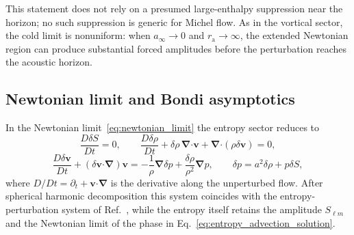 \documentclass[12pt,a4paper,preprint,nopreprintline]{elsarticle}
\begin{document}
This statement does not rely on a presumed large-enthalpy suppression near the horizon; no such suppression is generic for Michel flow. As in the vortical sector, the cold limit is nonuniform: when $a_{\infty}\rightarrow0$ and $r_{\mathrm{a}}\rightarrow\infty$, the extended Newtonian region can produce substantial forced amplitudes before the perturbation reaches the acoustic horizon.

\subsection{Newtonian limit and Bondi asymptotics}
\label{sec:newtonian_bondi_entropy}

In the Newtonian limit~\eqref{eq:newtonian_limit} the entropy sector reduces to
\begin{equation}
    \frac{D\delta S}{Dt}=0,
    \qquad
    \frac{D\delta\rho}{Dt}
    +\delta\rho\,\boldsymbol{\nabla}\boldsymbol{\cdot}\boldsymbol{v}
    +\boldsymbol{\nabla}\boldsymbol{\cdot}
        (\rho\delta\boldsymbol{v})=0,
    \label{eq:entropy_newtonian_continuity}
\end{equation}
\begin{equation}
    \frac{D\delta\boldsymbol{v}}{Dt}
    +
    (\delta\boldsymbol{v}\boldsymbol{\cdot}\boldsymbol{\nabla})
        \boldsymbol{v}
    =
    -\frac{1}{\rho}\boldsymbol{\nabla}\delta p
    +\frac{\delta\rho}{\rho^{2}}\boldsymbol{\nabla}p,
    \qquad
    \delta p=a^{2}\delta\rho+p\delta S,
    \label{eq:entropy_newtonian_euler}
\end{equation}
where $D/Dt=\partial_{t}+\boldsymbol{v}\boldsymbol{\cdot}\boldsymbol{\nabla}$ is the derivative along the unperturbed flow. After spherical harmonic decomposition this system coincides with the entropy-perturbation system of Ref.~\cite{KovalenkoIG_EreminMA_SpatialInstabilityOfSphericalAccretion_1998}, while the entropy itself retains the amplitude $S_{\ell m}$ and the Newtonian limit of the phase in Eq.~\eqref{eq:entropy_advection_solution}.
\end{document}
